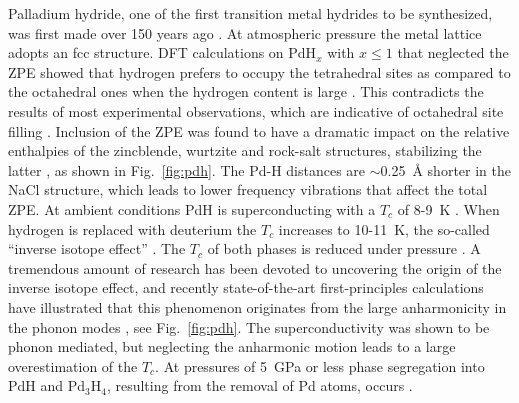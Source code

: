 \documentclass[12pt,letterpaper,oneside]{article}
\begin{document}
Palladium hydride, one of the first transition metal hydrides to be synthesized, was first made over 150 years ago \cite{Graham:1866}. At atmospheric pressure the metal lattice adopts an fcc structure. DFT calculations on PdH$_x$ with $x\le 1$ that neglected the ZPE showed that hydrogen prefers to occupy the tetrahedral sites as compared to the octahedral ones when the hydrogen content is large \cite{Caputo:2003,Houari:2014}. This contradicts the results of most experimental observations, which are indicative of octahedral site filling \cite{Worsham:1957}. Inclusion of the ZPE was found to have a dramatic impact on the relative enthalpies of the zincblende, wurtzite and rock-salt structures, stabilizing the latter \cite{Houari:2014}, as shown in Fig.\ \ref{fig:pdh}. The Pd-H distances are $\sim$0.25~\AA{} shorter in the NaCl structure, which leads to lower frequency vibrations that affect the total ZPE.  At ambient conditions PdH is superconducting with a $T_c$ of 8-9~K \cite{Schirber:1974}. When hydrogen is replaced with deuterium the $T_c$ increases to 10-11~K, the so-called ``inverse isotope effect'' \cite{Schirber:1974,Stritzker:1972}. The $T_c$ of both phases is reduced under pressure \cite{Skoskiewicz:1974a,Hemmes:1989a}. A tremendous amount of research has been devoted to uncovering the origin of the inverse isotope effect, and recently state-of-the-art first-principles calculations have illustrated that this phenomenon originates from the large anharmonicity in the phonon modes \cite{Errea:2013}, see Fig.\ \ref{fig:pdh}. The superconductivity was shown to be phonon mediated, but neglecting the anharmonic motion leads to a large overestimation of the $T_c$. At pressures of 5~GPa or less phase segregation into PdH and Pd$_3$H$_4$, resulting from the removal of Pd atoms, occurs \cite{Fukai:1994}.
\end{document}
